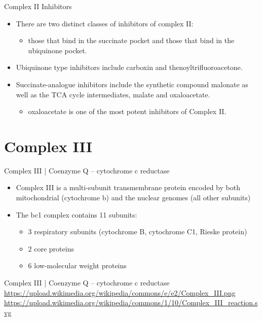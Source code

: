 \documentclass[presentation, smaller]{beamer}
\begin{document}
\begin{frame}[label={sec:org1147b35}]{Complex II Inhibitors}
\begin{itemize}
\item There are two distinct classes of inhibitors of complex II:
\begin{itemize}
\item those that bind in the succinate pocket and those that bind in the ubiquinone pocket.
\end{itemize}
\item Ubiquinone type inhibitors include carboxin and thenoyltrifluoroacetone.
\item Succinate-analogue inhibitors include the synthetic compound malonate as well as the TCA cycle intermediates, malate and oxaloacetate.
\begin{itemize}
\item oxaloacetate is one of the most potent inhibitors of Complex II.
\end{itemize}
\end{itemize}
\end{frame}

\section{Complex III}
\label{sec:org925c292}
\begin{frame}[label={sec:org86fe0e8}]{Complex III | Coenzyme Q – cytochrome c reductase}
\begin{itemize}
\item Complex III is a multi-subunit transmembrane protein encoded by both
mitochondrial (cytochrome b) and the nuclear genomes (all other
subunits)

\item The bc1 complex contains 11 subunits:
\begin{itemize}
\item 3 respiratory subunits (cytochrome B, cytochrome C1, Rieske protein)
\item 2 core proteins
\item 6 low-molecular weight proteins
\end{itemize}
\end{itemize}

\centering
\small
{}
\end{frame}

\begin{frame}[label={sec:orgefbf831}]{Complex III | Coenzyme Q – cytochrome c reductase}
\url{https://upload.wikimedia.org/wikipedia/commons/e/e2/Complex\_III.png}
\url{https://upload.wikimedia.org/wikipedia/commons/1/10/Complex\_III\_reaction.svg}
\end{frame}
\end{document}
